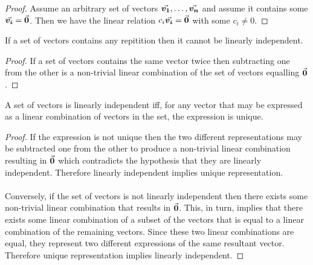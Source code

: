 \documentclass[MathsNotesBase.tex]{subfiles}
\begin{document}
{	\bigskip
	\begin{proof}
		Assume an arbitrary set of vectors ${ \vec{\bm{v_1}}, \dots , \vec{\bm{v_n}} }$ and assume it contains some ${ \vec{\bm{v_i}} = \vec{\bm{0}} }$. Then we have the linear relation ${ c_i\vec{\bm{v_i}} = \vec{\bm{0}} }$ with some ${ c_i \neq 0 }$.
	\end{proof}
	\begin{corollary}
		If a set of vectors contains any repitition then it cannot be linearly independent.
	\end{corollary}
	\begin{proof}
		If a set of vectors contains the same vector twice then subtracting one from the other is a non-trivial linear combination of the set of vectors equalling $\vec{\bm{0}}$.
	\end{proof}
	\begin{corollary}
		\label{coro:linearly_independent_iff_vector_reps_are_unique}
		A set of vectors is linearly independent iff, for any vector that may be expressed as a linear combination of vectors in the set, the expression is unique.
	\end{corollary}
	\begin{proof}
		If the expression is not unique then the two different representations may be subtracted one from the other to produce a non-trivial linear combination resulting in $\vec{\bm{0}}$ which contradicts the hypothesis that they are linearly independent. Therefore linearly independent implies unique representation.\\\\
		Conversely, if the set of vectors is not linearly independent then there exists some non-trivial linear combination that results in $\vec{\bm{0}}$. This, in turn, implies that there exists some linear combination of a subset of the vectors that is equal to a linear combination of the remaining vectors. Since these two linear combinations are equal, they represent two different expressions of the same resultant vector. Therefore unique representation implies linearly independent.
	\end{proof}
	
}
\end{document}
